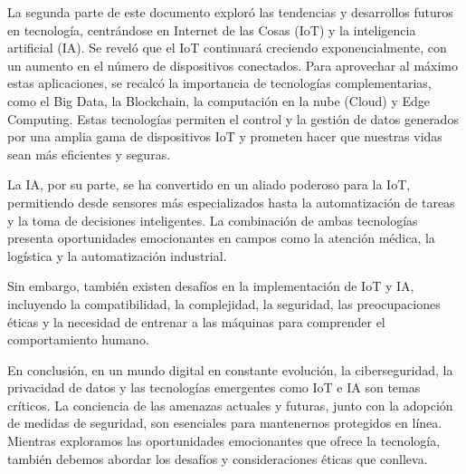 \documentclass[12pt]{article}
\begin{document}
  La segunda parte de este documento exploró las tendencias y desarrollos futuros en tecnología, centrándose en Internet de las Cosas (IoT) y la inteligencia artificial (IA). Se reveló que el IoT continuará creciendo exponencialmente, con un aumento en el número de dispositivos conectados. Para aprovechar al máximo estas aplicaciones, se recalcó la importancia de tecnologías complementarias, como el Big Data, la Blockchain, la computación en la nube (Cloud) y Edge Computing. Estas tecnologías permiten el control y la gestión de datos generados por una amplia gama de dispositivos IoT y prometen hacer que nuestras vidas sean más eficientes y seguras.

  La IA, por su parte, se ha convertido en un aliado poderoso para la IoT, permitiendo desde sensores más especializados hasta la automatización de tareas y la toma de decisiones inteligentes. La combinación de ambas tecnologías presenta oportunidades emocionantes en campos como la atención médica, la logística y la automatización industrial.

  Sin embargo, también existen desafíos en la implementación de IoT y IA, incluyendo la compatibilidad, la complejidad, la seguridad, las preocupaciones éticas y la necesidad de entrenar a las máquinas para comprender el comportamiento humano.

  En conclusión, en un mundo digital en constante evolución, la ciberseguridad, la privacidad de datos y las tecnologías emergentes como IoT e IA son temas críticos. La conciencia de las amenazas actuales y futuras, junto con la adopción de medidas de seguridad, son esenciales para mantenernos protegidos en línea. Mientras exploramos las oportunidades emocionantes que ofrece la tecnología, también debemos abordar los desafíos y consideraciones éticas que conlleva.
  
\end{document}

